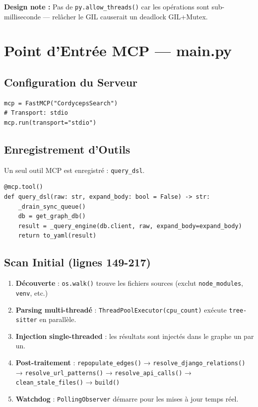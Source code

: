 \documentclass[12pt,a4paper]{article}
\newcommand{\code}[1]{\texttt{#1}}
\begin{document}
\textbf{Design note :} Pas de \code{py.allow\_threads()} car les opérations sont sub-milliseconde — relâcher le GIL causerait un deadlock GIL+Mutex.

\section{Point d'Entrée MCP — main.py}

\subsection{Configuration du Serveur}

\begin{verbatim}
mcp = FastMCP("CordycepsSearch")
# Transport: stdio
mcp.run(transport="stdio")
\end{verbatim}

\subsection{Enregistrement d'Outils}

Un seul outil MCP est enregistré : \code{query\_dsl}.

\begin{verbatim}
@mcp.tool()
def query_dsl(raw: str, expand_body: bool = False) -> str:
    _drain_sync_queue()
    db = get_graph_db()
    result = _query_engine(db.client, raw, expand_body=expand_body)
    return to_yaml(result)
\end{verbatim}

\subsection{Scan Initial (lignes 149-217)}

\begin{enumerate}
    \item \textbf{Découverte} : \code{os.walk()} trouve les fichiers sources (exclut \code{node\_modules}, \code{venv}, etc.)
    \item \textbf{Parsing multi-threadé} : \code{ThreadPoolExecutor(cpu\_count)} exécute \code{tree-sitter} en parallèle.
    \item \textbf{Injection single-threaded} : les résultats sont injectés dans le graphe un par un.
    \item \textbf{Post-traitement} : \code{repopulate\_edges()} → \code{resolve\_django\_relations()} → \code{resolve\_url\_patterns()} → \code{resolve\_api\_calls()} → \code{clean\_stale\_files()} → \code{build()}
    \item \textbf{Watchdog} : \code{PollingObserver} démarre pour les mises à jour temps réel.
\end{enumerate}
\end{document}
